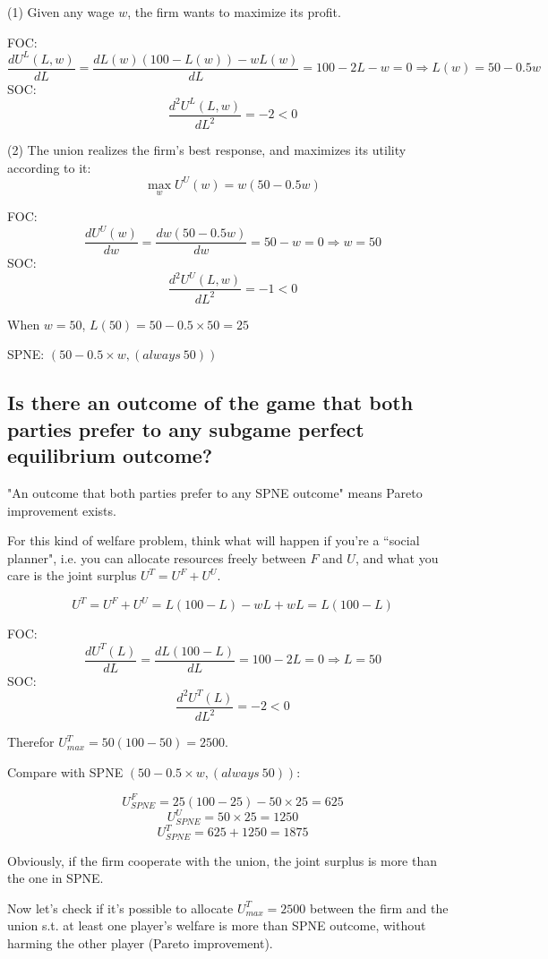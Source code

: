 \documentclass{article}
\begin{document}
(1) Given any wage $w$, the firm wants to maximize its profit. 

FOC:
$$\frac{d U^L(L,w)}{d L} = \frac{d L(w)(100-L(w)) - wL(w)}{d L} = 100-2L-w =0 \Rightarrow L(w) = 50-0.5w$$
SOC: 
$$\frac{d^2 U^L(L,w)}{d L^2} = -2<0$$

(2) The union realizes the firm's best response, and maximizes its utility according to it:
$$\max_{w} U^U(w) = w (50-0.5w)$$

FOC:
$$\frac{d U^U(w)}{d w} = \frac{d w (50-0.5w)}{d w} = 50-w =0 \Rightarrow w = 50$$
SOC: 
$$\frac{d^2 U^U(L,w)}{d L^2} = -1<0$$

When $w=50$, $L(50)=50-0.5\times50 =25$


SPNE: $(50-0.5\times w, (always \ 50))$

%
\subsection{Is there an outcome of the game that both parties prefer to any subgame perfect
equilibrium outcome? }

\begin{mdframed}[backgroundcolor=blue!20,linecolor=white]
"An outcome that both parties prefer to any SPNE outcome" means Pareto improvement exists.

\medskip

For this kind of welfare problem, think what will happen if you're a ``social planner", i.e. you can allocate resources freely between $F$ and $U$, and what you care is the joint surplus $U^T=U^F+U^U$.

\end{mdframed}

$$U^T=U^F+U^U = L(100-L) - wL +wL =L(100-L)$$

FOC:
$$\frac{d U^T(L)}{d L} = \frac{d L(100-L)}{d L} = 100-2L =0 \Rightarrow L = 50$$
SOC: 
$$\frac{d^2 U^T(L)}{d L^2} = -2<0$$

Therefor $U^T_{max} = 50 (100-50) =2500$.

\medskip

Compare with SPNE $(50-0.5\times w, (always \ 50))$:

$$U^F_{SPNE} = 25(100-25)-50\times 25 = 625$$
$$U^U_{SPNE} = 50 \times 25 = 1250$$
$$U^T_{SPNE} = 625 + 1250 = 1875$$

\begin{mdframed}[backgroundcolor=blue!20,linecolor=white]

Obviously, if the firm cooperate with the union, the joint surplus is more than the one in SPNE.

\medskip

Now let's check if it's possible to allocate $U^T_{max} = 2500$ between the firm and the union s.t. at least one player's welfare is more than SPNE outcome, without harming the other player (Pareto improvement).

\end{mdframed}
\end{document}
